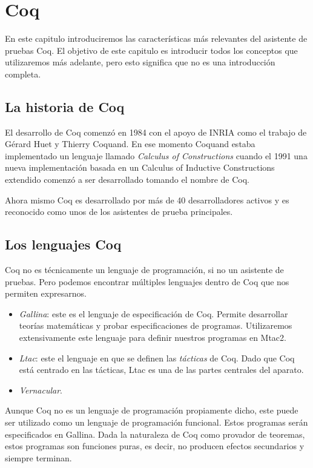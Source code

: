 \section{Coq}

En este capitulo introduciremos las características más relevantes del asistente de pruebas Coq. El objetivo de este capitulo es introducir todos los conceptos que utilizaremos más adelante, pero esto significa que no es una introducción completa.

\subsection{La historia de Coq}

El desarrollo de Coq comenzó en 1984 con el apoyo de INRIA como el trabajo de Gérard Huet y Thierry Coquand. En ese momento Coquand estaba implementado un lenguaje llamado \textit{Calculus of Constructions} cuando el 1991 una nueva implementación basada en un Calculus of Inductive Constructions extendido comenzó a ser desarrollado tomando el nombre de Coq.

Ahora mismo Coq es desarrollado por más de 40 desarrolladores activos y es reconocido como unos de los asistentes de prueba principales.

\subsection{Los lenguajes Coq}

Coq no es técnicamente un lenguaje de programación, si no un asistente de pruebas. Pero podemos encontrar múltiples lenguajes dentro de Coq que nos permiten expresarnos. 
\begin{itemize}
    \item \textit{Gallina}: este es el lenguaje de especificación de Coq. Permite desarrollar teorías matemáticas y probar especificaciones de programas. Utilizaremos extensivamente este lenguaje para definir nuestros programas en Mtac2.
    \item \textit{Ltac}: este el lenguaje en que se definen las \textit{tácticas} de Coq. Dado que Coq está centrado en las tácticas, Ltac es una de las partes centrales del aparato.
    \item \textit{Vernacular}.
\end{itemize}

Aunque Coq no es un lenguaje de programación propiamente dicho, este puede ser utilizado como un lenguaje de programación funcional. Estos programas serán especificados en Gallina. Dada la naturaleza de Coq como provador de teoremas, estos programas son funciones puras, es decir, no producen efectos secundarios y siempre terminan.

